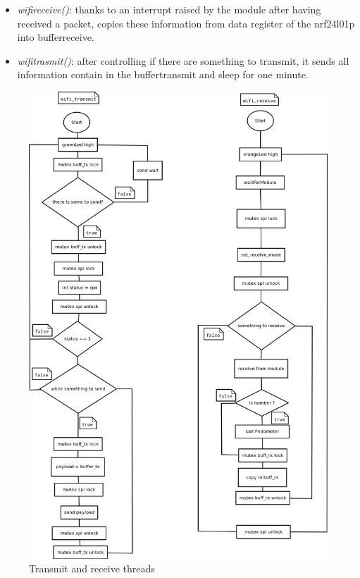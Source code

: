 \documentclass[11pt,a4paper,oneside]{article}
\begin{document}
\begin{itemize}
\item {\itshape wifi\textunderscore receive()}: thanks to an interrupt raised by the module after having received a packet, copies these information from data register of the nrf24l01p into buffer\textunderscore receive.
\item {\itshape wifi\textunderscore trasmit()}: after controlling if there are something to transmit, it sends all information contain in the buffer\textunderscore transmit and sleep for one minute.
\end{itemize}
\begin{figure}[H]
\centering
\includegraphics[scale=0.4]{./Immagini/threads.png}
\caption{Transmit and receive threads}
\label{Transmit and receive threads}
\end{figure}
\end{document}
